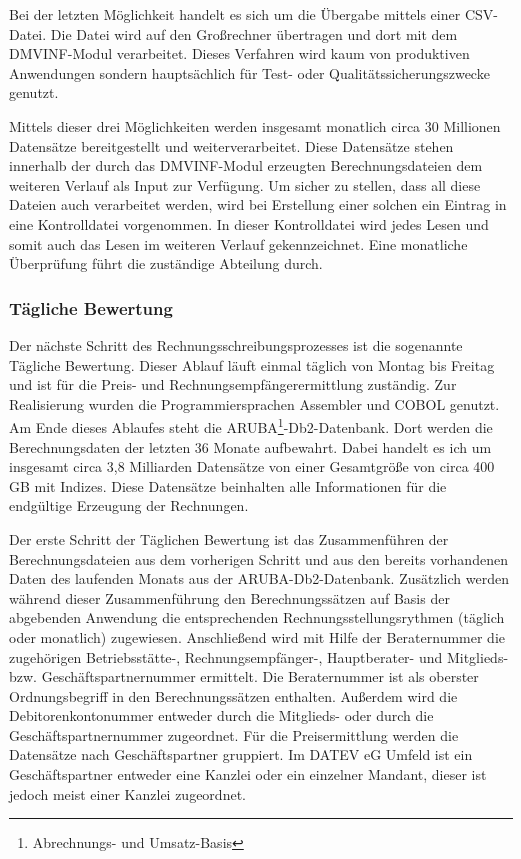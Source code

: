 Bei der letzten Möglichkeit handelt es sich um die Übergabe mittels einer CSV-Datei.
Die Datei wird auf den Großrechner übertragen und dort mit dem DMVINF-Modul verarbeitet.
Dieses Verfahren wird kaum von produktiven Anwendungen sondern hauptsächlich für Test- oder Qualitätssicherungszwecke genutzt.

Mittels dieser drei Möglichkeiten werden insgesamt monatlich circa 30 Millionen Datensätze bereitgestellt und weiterverarbeitet.
Diese Datensätze stehen innerhalb der durch das DMVINF-Modul erzeugten Berechnungsdateien dem weiteren Verlauf als Input zur Verfügung.
Um sicher zu stellen, dass all diese Dateien auch verarbeitet werden, wird bei Erstellung einer solchen ein Eintrag in eine Kontrolldatei vorgenommen.
In dieser Kontrolldatei wird jedes Lesen und somit auch das Lesen im weiteren Verlauf gekennzeichnet.
Eine monatliche Überprüfung führt die zuständige Abteilung durch.

\subsubsection{Tägliche Bewertung}
Der nächste Schritt des Rechnungsschreibungsprozesses ist die sogenannte Tägliche Bewertung.
Dieser Ablauf läuft einmal täglich von Montag bis Freitag und ist für die Preis- und Rechnungsempfängerermittlung zuständig.
Zur Realisierung wurden die Programmiersprachen Assembler und COBOL genutzt.
Am Ende dieses Ablaufes steht die ARUBA\footnote{Abrechnungs- und Umsatz-Basis}-Db2-Datenbank.
Dort werden die Berechnungsdaten der letzten 36 Monate aufbewahrt.
Dabei handelt es ich um insgesamt circa 3,8 Milliarden Datensätze von einer Gesamtgröße von circa 400 GB mit Indizes.
Diese Datensätze beinhalten alle Informationen für die endgültige Erzeugung der Rechnungen.

Der erste Schritt der Täglichen Bewertung ist das Zusammenführen der Berechnungsdateien aus dem vorherigen Schritt und aus den bereits vorhandenen Daten des laufenden Monats aus der ARUBA-Db2-Datenbank.
Zusätzlich werden während dieser Zusammenführung den Berechnungssätzen auf Basis der abgebenden Anwendung die entsprechenden Rechnungsstellungsrythmen (täglich oder monatlich) zugewiesen.
Anschließend wird mit Hilfe der Beraternummer die zugehörigen Betriebsstätte-, Rechnungsempfänger-, Hauptberater- und Mitglieds- bzw. Geschäftspartnernummer ermittelt.
Die Beraternummer ist als oberster Ordnungsbegriff in den Berechnungssätzen enthalten.
Außerdem wird die Debitorenkontonummer entweder durch die Mitglieds- oder durch die Geschäftspartnernummer zugeordnet.
Für die Preisermittlung werden die Datensätze nach Geschäftspartner gruppiert.
Im DATEV eG Umfeld ist ein Geschäftspartner entweder eine Kanzlei oder ein einzelner Mandant, dieser ist jedoch meist einer Kanzlei zugeordnet.

